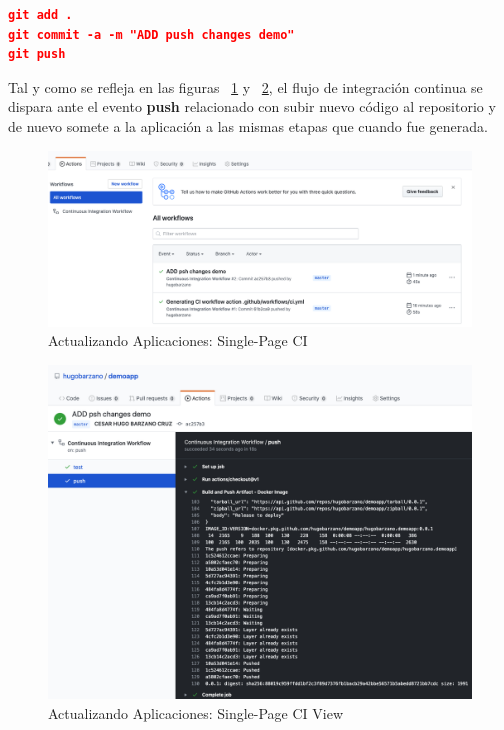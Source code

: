 \documentclass[a4paper,11pt]{book}
\begin{document}
 
 
\begin{lstlisting}[language=json,firstnumber=1]
git add .
git commit -a -m "ADD push changes demo"
git push
\end{lstlisting}


 
 Tal y como se refleja en las figuras  ~\ref{2_6} y  ~\ref{2_7},  el flujo de integración continua se dispara ante el evento \textbf{push} relacionado con subir nuevo código al repositorio y de nuevo somete a la aplicación a las mismas etapas que cuando fue generada.
 
  \begin{figure}[H]
\centering
\includegraphics[scale=0.3]{imagenes/casouso_a/2_6.png}
\caption{  Actualizando Aplicaciones: Single-Page CI }
\label{2_6}
\end{figure}

  \begin{figure}[H]
\centering
\includegraphics[scale=0.4]{imagenes/casouso_a/2_7.png}
\caption{ Actualizando Aplicaciones: Single-Page CI View  }
\label{2_7}
\end{figure}
\end{document}
